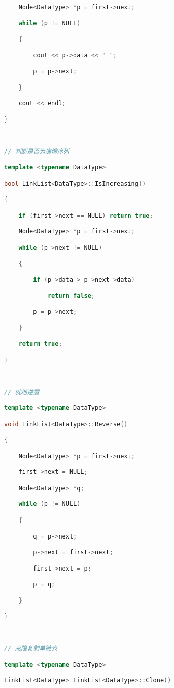 \begin{lstlisting}[language=C++]
    Node<DataType> *p = first->next;

    while (p != NULL)

    {

        cout << p->data << " ";

        p = p->next;

    }

    cout << endl;

}

  

// 判断是否为递增序列

template <typename DataType>

bool LinkList<DataType>::IsIncreasing()

{

    if (first->next == NULL) return true;

    Node<DataType> *p = first->next;

    while (p->next != NULL)

    {

        if (p->data > p->next->data)

            return false;

        p = p->next;

    }

    return true;

}

  

// 就地逆置

template <typename DataType>

void LinkList<DataType>::Reverse()

{

    Node<DataType> *p = first->next;

    first->next = NULL;

    Node<DataType> *q;

    while (p != NULL)

    {

        q = p->next;

        p->next = first->next;

        first->next = p;

        p = q;

    }

}

  

// 克隆复制单链表

template <typename DataType>

LinkList<DataType> LinkList<DataType>::Clone()


\end{lstlisting}
